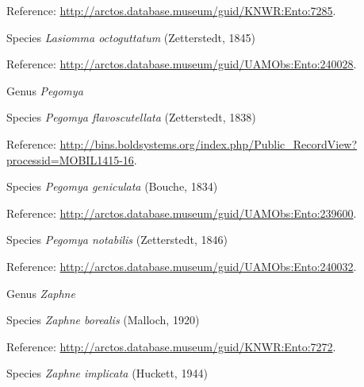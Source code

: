 \documentclass[9pt, article]{memoir}
\begin{document}
\begin{multicols}{2}
\vspace{6pt}Reference: 
\url{http://arctos.database.museum/guid/KNWR:Ento:7285}.

\vspace{6pt}\noindent\hspace{36pt}Species \textit{Lasiomma octoguttatum} (Zetterstedt, 1845)


\vspace{6pt}Reference: 
\url{http://arctos.database.museum/guid/UAMObs:Ento:240028}.

\vspace{6pt}\noindent\hspace{30pt}Genus \textit{Pegomya}


\vspace{6pt}\noindent\hspace{36pt}Species \textit{Pegomya flavoscutellata} (Zetterstedt, 1838)


\vspace{6pt}Reference: 
\url{http://bins.boldsystems.org/index.php/Public_RecordView?processid=MOBIL1415-16}.

\vspace{6pt}\noindent\hspace{36pt}Species \textit{Pegomya geniculata} (Bouche, 1834)


\vspace{6pt}Reference: 
\url{http://arctos.database.museum/guid/UAMObs:Ento:239600}.

\vspace{6pt}\noindent\hspace{36pt}Species \textit{Pegomya notabilis} (Zetterstedt, 1846)


\vspace{6pt}Reference: 
\url{http://arctos.database.museum/guid/UAMObs:Ento:240032}.

\vspace{6pt}\noindent\hspace{30pt}Genus \textit{Zaphne}


\vspace{6pt}\noindent\hspace{36pt}Species \textit{Zaphne borealis} (Malloch, 1920)


\vspace{6pt}Reference: 
\url{http://arctos.database.museum/guid/KNWR:Ento:7272}.

\vspace{6pt}\noindent\hspace{36pt}Species \textit{Zaphne implicata} (Huckett, 1944)



\end{multicols}
\end{document}
